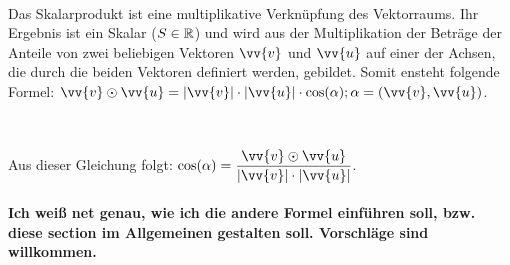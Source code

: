     \begin{minipage}{0.5\textwidth}
        \paragraph{} Das Skalarprodukt ist eine multiplikative Verknüpfung des Vektorraums. Ihr Ergebnis ist ein Skalar ($S\in\mathbb{R}$) und wird aus der
        Multiplikation der Beträge der Anteile von zwei beliebigen Vektoren $\vv{v}$ und $\vv{u}$ auf einer der Achsen, die durch die beiden Vektoren
        definiert werden, gebildet. Somit ensteht folgende Formel: $\vv{v}\odot\vv{u}=|\vv{v}|\cdot|\vv{u}|\cdot\cos(\alpha);\alpha=(\vv{v},\vv{u})$.
    \end{minipage}
    \begin{minipage}{0.05\textwidth}
        \quad
    \end{minipage}
    \begin{minipage}{0.45\textwidth}
    \end{minipage}
    \\
    \begin{Bemerkung}
        Aus dieser Gleichung folgt: $\cos(\alpha)=\dfrac{\vv{v}\odot\vv{u}}{|\vv{v}|\cdot|\vv{u}|}$.
    \end{Bemerkung}
    \paragraph{} \textbf{Ich weiß net genau, wie ich die andere Formel einführen soll, bzw. diese section im Allgemeinen gestalten soll.
     Vorschläge sind willkommen.}

